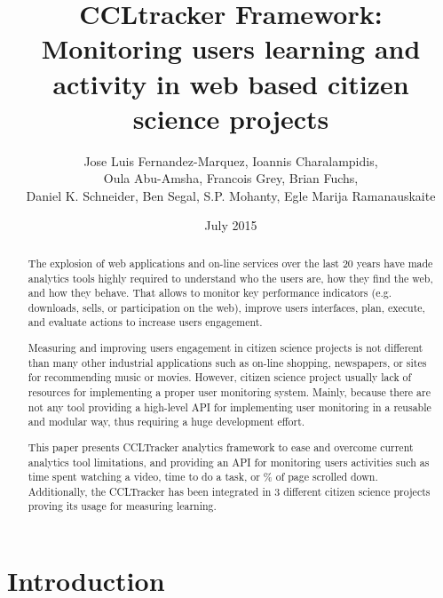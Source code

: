 \documentclass{article}
\title{CCLtracker Framework: Monitoring users learning and activity in web based citizen science projects
}
\author{ Jose Luis Fernandez-Marquez, Ioannis Charalampidis,\\ Oula Abu-Amsha, Francois Grey, Brian Fuchs, \\ Daniel K. Schneider, Ben Segal, S.P. Mohanty, Egle Marija Ramanauskaite}
\date{July 2015}
\begin{document}
\maketitle

\begin{abstract}
The explosion of web applications and on-line services over the last 20 years have made analytics tools highly required to understand who the users are, how they find the web, and how they behave. That allows to monitor key performance indicators (e.g. downloads, sells, or participation on the web), improve users interfaces, plan, execute, and evaluate actions to increase users engagement. 

Measuring and improving users engagement in citizen science projects is not different than many other industrial applications such as on-line shopping, newspapers, or sites for recommending music or movies. However, citizen science project usually lack of resources for implementing a proper user monitoring system. Mainly, because there are not any tool providing a high-level API for implementing user monitoring in a reusable and modular way, thus requiring a huge development effort.  

This paper presents CCLTracker analytics framework to ease and overcome current analytics tool limitations, and providing an API for monitoring users activities such as time spent watching a video, time to do a task, or \% of page scrolled down. Additionally, the CCLTracker has been integrated in 3 different citizen science projects proving its usage for measuring learning. 

\end{abstract}

\section{Introduction}

\end{document}
